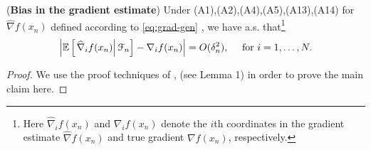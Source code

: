 \begin{lemma}(\textbf{Bias in the gradient estimate})
\label{lemma:1rdsa-bias}
Under (A1),(A2),(A4),(A5),(A13),(A14) for $\widehat\nabla f(x_n)$ defined according to  \eqref{eq:grad-gen} , we have a.s. that\footnote{Here $\widehat\nabla_i f(x_n)$ and $\nabla_i f(x_n)$ denote the $i$th coordinates in the gradient estimate $\widehat\nabla f(x_n)$ and true gradient $\nabla f(x_n)$, respectively.}
\begin{align}
 \left| \mathbb{E}\left[\left.\widehat\nabla_i f(x_n)\right| \mathcal{F}_n \right] - \nabla_i f(x_n)\right| = O(\delta_n^2),  \quad \text{ for } i=1,\ldots,N.
\end{align} 
\end{lemma}

\begin{proof}
We use the proof techniques of \cite{spall},\cite{prashanth2015rdsa} (see Lemma 1) in order to prove the main claim here.
 

\end{proof}
